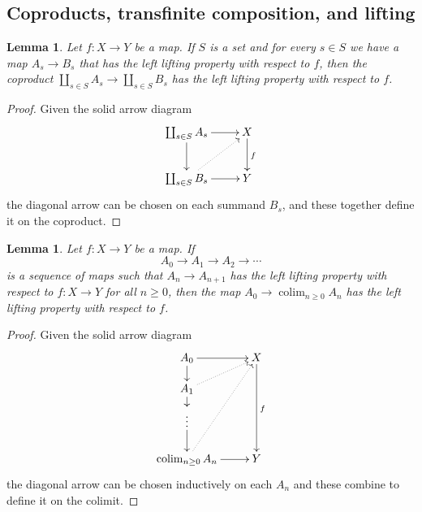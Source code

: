 \documentclass[12pt]{amsart}
\numberwithin{equation}{section}
\theoremstyle{slplain}
\newtheorem{lem}[equation]{Lemma}
\theoremstyle{definition}
\theoremstyle{remark}
\DeclareMathOperator*{\colim}{colim}
\begin{document}
\subsection{Coproducts, transfinite composition, and lifting}
\label{sec:CoprodLift}

\begin{lem}
  \label{lem:coprodLLP}
  Let $f\colon X \to Y$ be a map.  If $S$ is a set and for every $s
  \in S$ we have a map $A_{s} \to B_{s}$ that has the left lifting
  property with respect to $f$, then the coproduct $\coprod_{s\in S}
  A_{s} \to \coprod_{s\in S} B_{s}$ has the left lifting property with
  respect to $f$.
\end{lem}

\begin{proof}
  Given the solid arrow diagram
  \begin{displaymath}
    \xymatrix{
      {\coprod_{s\in S} A_{s}} \ar[r] \ar[d]
      & {X} \ar[d]^{f}\\
      {\coprod_{s\in S} B_{s}} \ar[r] \ar@{..>}[ur]
      & {Y}
    }
  \end{displaymath}
  the diagonal arrow can be chosen on each summand $B_{s}$, and these
  together define it on the coproduct.
\end{proof}

\begin{lem}
  \label{lem:compLLP}
  Let $f\colon X \to Y$ be a map.  If
  \begin{displaymath}
    A_{0} \to A_{1} \to A_{2} \to \cdots
  \end{displaymath}
  is a sequence of maps such that $A_{n} \to A_{n+1}$ has the left
  lifting property with respect to $f\colon X \to Y$ for all $n \ge
  0$, then the map $A_{0} \to \colim_{n\ge 0} A_{n}$ has the left
  lifting property with respect to $f$.
\end{lem}

\begin{proof}
  Given the solid arrow diagram
  \begin{displaymath}
    \xymatrix@R=3ex{
      {A_{0}} \ar[r] \ar[d]
      & {X} \ar[ddd]^{f}\\
      {A_{1}} \ar[d] \ar@{..>}[ur]\\
      {\vdots} \ar[d]\\
      {\colim_{n\ge 0} A_{n}} \ar[r] \ar@{..>}[uuur]
      & {Y}
    }
  \end{displaymath}
  the diagonal arrow can be chosen inductively on each $A_{n}$ and
  these combine to define it on the colimit.
\end{proof}
\end{document}
